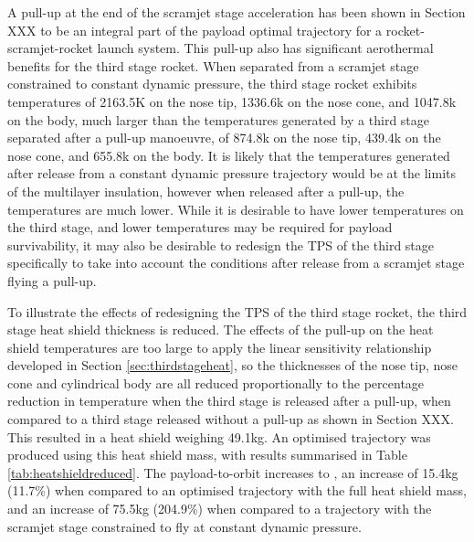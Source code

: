 A pull-up at the end of the scramjet stage acceleration has been shown in Section XXX to be an integral part of the payload optimal trajectory for a rocket-scramjet-rocket launch system. This pull-up also has significant aerothermal benefits for the third stage rocket. When separated from a scramjet stage constrained to constant dynamic pressure, the third stage rocket exhibits temperatures of 2163.5K on the nose tip, 1336.6k on the nose cone, and 1047.8k on the body, much larger than the temperatures generated by a third stage separated after a pull-up manoeuvre, of 874.8k on the nose tip, 439.4k on the nose cone, and 655.8k on the body. It is likely that the temperatures generated after release from a constant dynamic pressure trajectory would be at the limits of the multilayer insulation, however when released after a pull-up, the temperatures are much lower. While it is desirable to have lower temperatures on the third stage, and lower temperatures may be required for payload survivability, it may also be desirable to redesign the TPS of the third stage specifically to take into account the conditions after release from a scramjet stage flying a pull-up. 

To illustrate the effects of redesigning the TPS of the third stage rocket, the third stage heat shield thickness is reduced. The effects of the pull-up on the heat shield temperatures are too large to apply the linear sensitivity relationship developed in Section \ref{sec:thirdstageheat}, so the thicknesses of the nose tip, nose cone and cylindrical body are all reduced proportionally to the percentage reduction in temperature when the third stage is released after a pull-up, when compared to a third stage released without a pull-up as shown in Section XXX. This resulted in a heat shield weighing 49.1kg. An optimised trajectory was produced using this heat shield mass, with results summarised in Table \ref{tab:heatshieldreduced}. The payload-to-orbit increases to \PayloadToOrbitTPSreduced, an increase of 15.4kg (11.7\%) when compared to an optimised trajectory with the full heat shield mass, and an increase of 75.5kg (204.9\%) when compared to a trajectory with the scramjet stage constrained to fly at constant dynamic pressure. 

%
%
%
%
%
%
%
%
%
%
%
%
%
%
%
%
%


